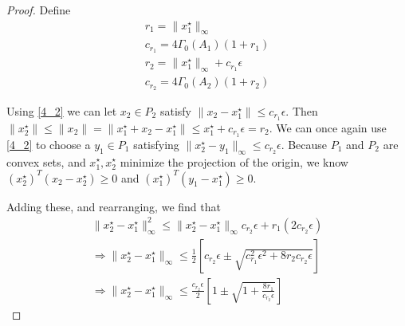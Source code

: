 \documentclass{article}
\theoremstyle{case}
\newcommand{\huff}{{\Gamma_0}}
\begin{document}
\begin{proof}
Define
\begin{align*}
r_1 = \|x_1^{\star}\|_{\infty} \\
c_{r_1} = 4\huff(A_1)\left(1 + r_1\right) \\
r_2 =  \|x_1^{\star}\|_{\infty} + c_{r_1}\epsilon \\
c_{r_2}=  4\huff(A_2)\left(1 + r_2\right)
\end{align*}

Using \cref{4_2} we can let $x_2 \in P_2$ satisfy $\|x_2 - x_1^{\star}\| \le c_{r_1}\epsilon$.
Then
$\|x_2^{\star}\| \le \|x_2\| = \|x_1^{\star} + x_2 - x_1^{\star}\| \le x_1^{\star} + c_{r_1}\epsilon = r_2$.
We can once again use \cref{4_2} to choose a $y_1 \in P_1$ satisfying $\|x_2^{\star} - y_1\|_{\infty} \le c_{r_2}\epsilon$.
Because $P_1$ and $P_2$ are convex sets, and $x_1^{\star}, x_2^{\star}$ minimize the projection of the origin, we know
$\left(x_2^{\star}\right)^T \left(x_2 - x_2^{\star}\right)\ge 0$ and
$\left(x_1^{\star}\right)^T \left(y_1 - x_1^{\star}\right)\ge 0$.

Adding these, and rearranging, we find that
\begin{align*}
\|x_2^{\star} - x_1^{\star}\|_{\infty}^2 \le \|x_2^{\star} - x_1^{\star}\|_{\infty} c_{r_2}\epsilon + r_1(2c_{r_2}\epsilon) \\
\Longrightarrow \|x_2^{\star} - x_1^{\star}\|_{\infty} \le \frac 1 2 \left[c_{r_2}\epsilon \pm \sqrt{c_{r_1}^2\epsilon^2 + 8r_2c_{r_2}\epsilon}\right] \\
\Longrightarrow \|x_2^{\star} - x_1^{\star}\|_{\infty} \le \frac {c_{r_2}\epsilon} 2 \left[1 \pm \sqrt{1 + \frac{8r_1}{c_{r_2}\epsilon}}\right] 
\end{align*}


\end{proof}
\end{document}
